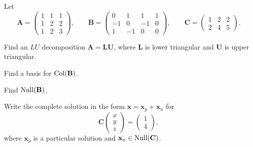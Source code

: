 \begin{problem}
Let
\[
\mathbf A=
\begin{pmatrix}
1&1&1\\
1&2&2\\
1&2&3
\end{pmatrix},
\qquad
\mathbf B=
\begin{pmatrix}
0&1&1&1\\
-1&0&-1&0\\
1&-1&0&0
\end{pmatrix},
\qquad
\mathbf C=
\begin{pmatrix}
1&2&2\\
2&4&5
\end{pmatrix}.
\]
\begin{problemsubparts}
\item Find an $LU$ decomposition $\mathbf A=\mathbf L\mathbf U$, where $\mathbf L$ is lower triangular and $\mathbf U$ is upper triangular.
\item Find a basis for $\operatorname{Col}(\mathbf B)$.
\item Find $\operatorname{Null}(\mathbf B)$.
\item Write the complete solution in the form $\mathbf x=\mathbf x_p+\mathbf x_n$ for
\[
\mathbf C
\begin{pmatrix}
x\\y\\z
\end{pmatrix}
=
\begin{pmatrix}
1\\4
\end{pmatrix},
\]
where $\mathbf x_p$ is a particular solution and $\mathbf x_n\in\operatorname{Null}(\mathbf C)$.
\end{problemsubparts}
\end{problem}

